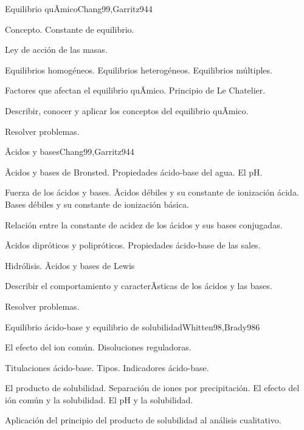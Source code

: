\begin{syllabus}
\begin{unit}{Equilibrio quÃ­mico}{Chang99,Garritz94}{4}
\begin{topics}
      \item Concepto. Constante de equilibrio.
      \item Ley de acción de las masas.
      \item Equilibrios homogéneos. Equilibrios heterogéneos. Equilibrios múltiples.
      \item Factores que afectan el equilibrio quÃ­mico. Principio de Le Chatelier.
    \end{topics}
   \begin{unitgoals}
      \item Describir, conocer y aplicar los conceptos del equilibrio quÃ­mico.
      \item Resolver problemas.
   \end{unitgoals}
\end{unit}

\begin{unit}{Ãcidos y bases}{Chang99,Garritz94}{4}
\begin{topics}
	\item Ãcidos y bases de Bronsted. Propiedades ácido-base del agua. El pH.
	\item Fuerza de los ácidos y bases. Ãcidos débiles y su constante de ionización ácida. Bases débiles y su constante de ionización básica. 
	\item Relación entre la constante de acidez de los ácidos y sus bases conjugadas.
	\item Ãcidos dipróticos y polipróticos. Propiedades ácido-base de las sales.
	\item Hidrólisis.  Ãcidos y bases de Lewis
\end{topics}

\begin{unitgoals}
	\item Describir el comportamiento y caracterÃ­sticas de los ácidos y las bases.
	\item Resolver problemas.
\end{unitgoals}
\end{unit}

\begin{unit}{Equilibrio ácido-base y equilibrio de solubilidad}{Whitten98,Brady98}{6}
\begin{topics}
	\item El efecto del ion común. Disoluciones reguladoras.
	\item Titulaciones ácido-base. Tipos.  Indicadores ácido-base.
	\item El producto de solubilidad. Separación de iones por precipitación. El efecto del ión común y la solubilidad. El pH y la solubilidad.
	\item Aplicación del principio del producto de solubilidad al análisis cualitativo.
\end{topics}


\end{unit}
\end{syllabus}
